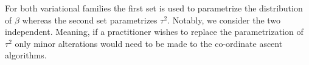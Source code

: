 For both variational families the first set is used to parametrize the distribution of $\beta$ whereas the second set parametrizes $\tau^2$. Notably, we consider the two independent. Meaning, if a practitioner wishes to replace the parametrization of $\tau^2$ only minor alterations would need to be made to the co-ordinate ascent algorithms.

